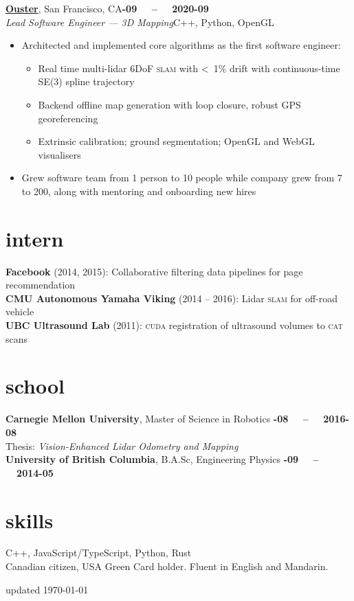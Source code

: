 \documentclass[margin,10pt]{res}
\begin{document}
\begin{resume}
    \href{https://ouster.com}{\textbf{Ouster}}, San Francisco, CA\hfill \textsc{\bfseries{}-09~~ -- ~~2020-09}\\
    \textit{Lead Software Engineer --- 3D Mapping}\hfill C++, Python, OpenGL
    \vspace{0.5em}
    \begin{itemize}
        \item Architected and implemented core algorithms as the first software engineer:
        \begin{itemize}
            \item Real time multi-lidar 6DoF \textsc{slam} with <~1\% drift with continuous-time SE(3) spline trajectory
            \item Backend offline map generation with loop closure, robust GPS georeferencing
            \item Extrinsic calibration; ground segmentation; OpenGL and WebGL visualisers
        \end{itemize}
        \item Grew software team from 1 person to 10 people while company grew from 7 to 200, along with mentoring and onboarding new hires
    \end{itemize}
\section{\sc \lsstyle intern}
    \textbf{Facebook} (2014, 2015): Collaborative filtering data pipelines for page recommendation\\
    \textbf{CMU Autonomous Yamaha Viking} (2014 -- 2016): Lidar \textsc{slam} for off-road vehicle \\
    \textbf{UBC Ultrasound Lab} (2011): \textsc{cuda} registration of ultrasound volumes to \textsc{cat} scans
\section{\sc \lsstyle school}
    \textbf{Carnegie Mellon University}, Master of Science in Robotics \hfill \textsc{\bfseries{}-08~~ -- ~~2016-08}\\
    Thesis: \textit{Vision-Enhanced Lidar Odometry and Mapping}\vspace{3pt}\\
    \textbf{University of British Columbia}, B.A.Sc, Engineering Physics \hfill \textsc{\bfseries{}-09~~ -- ~~2014-05}\\
\section{\sc \lsstyle skills}
    C++, JavaScript/TypeScript, Python, Rust \\
    Canadian citizen, USA Green Card holder. Fluent in English and Mandarin.\\
\end{resume}
\begin{minipage}[t]{\textwidth}
    \flushright
    \small
    \sc \lsstyle
    \hfill updated \today
\end{minipage}
\end{document}
